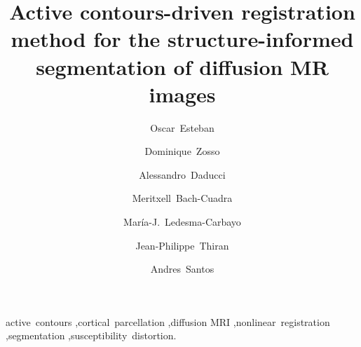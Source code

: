 \documentclass[3p,authoryear,fleqn]{elsarticle}
\begin{document}
\begin{frontmatter}


\title{Active contours-driven registration method for the structure-informed segmentation of diffusion MR images}

\author[bit,ciber]{Oscar~Esteban}
\author[ucla]{Dominique~Zosso}
\author[scil,lts5]{Alessandro~Daducci}
\author[chuv,lts5]{Meritxell~Bach-Cuadra}
\author[bit,ciber]{Mar\'ia-J.~Ledesma-Carbayo}
\author[lts5]{Jean-Philippe~Thiran}
\author[bit,ciber]{Andres~Santos}


\address[bit]{Biomedical Image Technologies (BIT), ETSI Telecomunicaci\'on, Universidad Polit\'ecnica de Madrid, Madrid, Spain}
\address[ciber]{Centro de Investigaci\'on Biom\'edica en Red en Bioingenier\'ia, Biomateriales y Nanomedicina (CIBER-BBN), Zaragoza, Spain}
\address[ucla]{Department of Mathematics, University of California,
Los Angeles (UCLA), Los Angeles, CA, US}
\address[scil]{Computer Science Department, Faculty of Science, Universit\'e de Sherbrooke, 2500 Boulevard Universit\'e, Sherbrooke, QC J1K 2R1, Canada}
\address[lts5]{Signal Processing Laboratory (LTS5), \'Ecole Polytechnique
F\'ed\'erale de Lausanne (EPFL), Lausanne, Switzerland}
\address[chuv]{Dept. of Radiology, CIBM, University
Hospital Center (CHUV) and University of Lausanne (UNIL), Lausanne, Switzerland}

\begin{abstract}

\end{abstract}

\begin{keyword}
active~contours \sep cortical~parcellation \sep diffusion MRI \sep nonlinear~registration \sep segmentation \sep susceptibility~distortion.
\end{keyword}

\end{frontmatter}

\linenumbers











\appendix
{}


%


\end{document}
